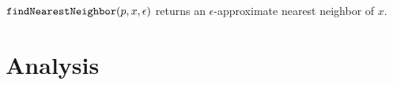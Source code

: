 \documentclass[../main.tex]{subfiles}
\newcommand{\findnn}{\ensuremath{\textnormal{\ttfamily findNearestNeighbor}}}
\begin{document}
\begin{theorem}
    $\findnn(p,x,\epsilon)$ returns an $\epsilon$-approximate nearest neighbor of $x$.
\end{theorem}

\begin{theorem}
\end{theorem}


\section{Analysis}
\end{document}
